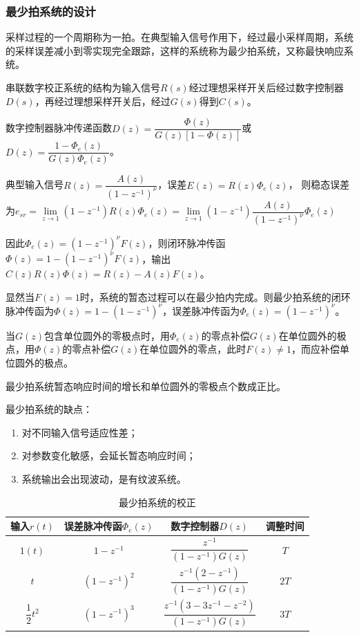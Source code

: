 \documentclass[11pt,a4paper]{ctexart}
\begin{document}
        \subsubsection{最少拍系统的设计}
            采样过程的一个周期称为一拍。在典型输入信号作用下，经过最小采样周期，系统的采样误差减小到零实现完全跟踪，这样的系统称为最少拍系统，又称最快响应系统。

            串联数字校正系统的结构为输入信号$R(s)$经过理想采样开关后经过数字控制器$D(s)$，再经过理想采样开关后，经过$G(s)$得到$C(s)$。

            数字控制器脉冲传递函数$D(z)=\dfrac{\varPhi(z)}{G(z)[1-\varPhi(z)]}$或$D(z)=\dfrac{1-\varPhi_e(z)}{G(z)\varPhi_e(z)}$。

            典型输入信号$R(z)=\dfrac{A(z)}{(1-z^{-1})^\nu}$，误差$E(z)=R(z)\varPhi_e(z)$，
            则稳态误差为$e_{sr}=\lim\limits_{z\rightarrow1}(1-z^{-1})R(z)\varPhi_e(z)=\lim\limits_{z\rightarrow1}(1-z^{-1})\dfrac{A(z)}{(1-z^{-1})^\nu}\varPhi_e(z)$

            因此$\varPhi_e(z)=(1-z^{-1})^{\nu}F(z)$，则闭环脉冲传函$\varPhi(z)=1-(1-z^{-1})^\nu F(z)$，输出$C(z)R(z)\varPhi(z)=R(z)-A(z)F(z)$。

            显然当$F(z)=1$时，系统的暂态过程可以在最少拍内完成。则最少拍系统的闭环脉冲传函为$\varPhi(z)=1-(1-z^{-1})^\nu$，误差脉冲传函为$\varPhi_e(z)=(1-z^{-1})^\nu$。

            当$G(z)$包含单位圆外的零极点时，用$\varPhi_e(z)$的零点补偿$G(z)$在单位圆外的极点，用$\varPhi(z)$的零点补偿$G(z)$在单位圆外的零点，此时$F(z)\neq1$，而应补偿单位圆外的极点。

            最少拍系统暂态响应时间的增长和单位圆外的零极点个数成正比。

            最少拍系统的缺点：
            \begin{enumerate}
                \item 对不同输入信号适应性差；
                \item 对参数变化敏感，会延长暂态响应时间；
                \item 系统输出会出现波动，是有纹波系统。
            \end{enumerate}

            \begin{table}[H]
                \centering
                \caption{最少拍系统的校正}
                \begin{tabular}{|c|c|c|c|}
                    \hline
                    输入$r(t)$ & 误差脉冲传函$\varPhi_e(z)$ & 数字控制器$D(z)$ & 调整时间 \\
                    \hline
                    $1(t)$ & $1-z^{-1}$ & $\dfrac{z^{-1}}{(1-z^{-1})G(z)}$ & $T$ \\
                    \hline
                    $t$ & $(1-z^{-1})^2$ & $\dfrac{z^{-1}(2-z^{-1})}{(1-z^{-1})G(z)}$ & $2T$ \\
                    \hline
                    $\dfrac{1}{2}t^2$ & $(1-z^{-1})^3$ & $\dfrac{z^{-1}(3-3z^{-1}-z^{-2})}{(1-z^{-1})G(z)}$ & $3T$ \\
                    \hline
                \end{tabular}
            \end{table}
\end{document}
